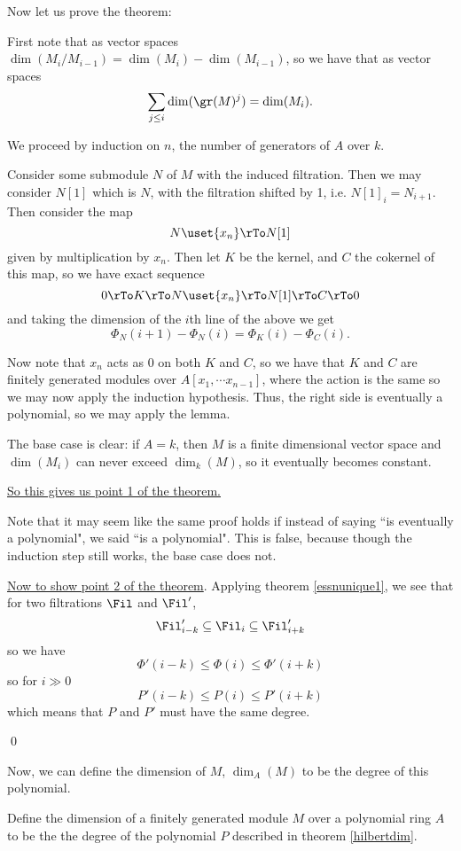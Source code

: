 \documentclass[12 pt]{article}
\theoremstyle{definition}
\begin{document}
Now let us prove the theorem:


First note that as vector spaces $\dim(M_i/M_{i-1})=\dim(M_i)-\dim(M_{i-1})$, so we have that as vector spaces
\[\sum_{j \leq i} \dim(\gr(M)^j)=\dim(M_i).\]

We proceed by induction on $n$, the number of generators of $A$ over $k$.

Consider some submodule $N$ of $M$ with the induced filtration. Then we may consider $N[1]$ which is $N$, with the filtration shifted by 1, i.e. $N[1]_i=N_{i+1}$. Then consider the map
\[N \uset{x_n}\rTo N[1]\]
given by multiplication by $x_n$. Then let $K$ be the kernel, and $C$ the cokernel of this map, so we have exact sequence
\[0 \rTo K \rTo N \uset{x_n}\rTo N[1] \rTo C \rTo 0\]
and taking the dimension of the $i$th line of the above we get
\[\Phi_N(i+1)-\Phi_N(i)=\Phi_K(i)-\Phi_C(i).\]

Now note that $x_n$ acts as 0 on both $K$ and $C$, so we have that $K$ and $C$ are finitely generated modules over $A[x_1, \cdots x_{n-1}]$, where the action is the same so we may now apply the induction hypothesis. Thus, the right side is eventually a polynomial, so we may apply the lemma.

The base case is clear: if $A=k$, then $M$ is a finite dimensional vector space and $\dim(M_i)$ can never exceed $\dim_k(M)$, so it eventually becomes constant.

\uline{So this gives us point 1 of the theorem.}

\begin{remark} Note that it may seem like the same proof holds if instead of saying ``is eventually a polynomial", we said ``is a polynomial". This is false, because though the induction step still works, the base case does not.
\end{remark}

\uline{Now to show point 2 of the theorem}. Applying theorem \ref{essnunique1}, we see that for two filtrations $\Fil$ and $\Fil'$, \[\Fil'_{i-k} \subseteq \Fil_i \subseteq \Fil_{i+k}'\]
so we have
\[\Phi'(i-k) \leq \Phi(i) \leq \Phi'(i+k)\]
so for $i \gg 0$
\[P'(i-k) \leq P(i) \leq P'(i+k)\]
which means that $P$ and $P'$ must have the same degree.

\qed

Now, we can define the dimension of $M$, $\dim_A(M)$ to be the degree of this polynomial.

\begin{definition} Define the dimension of a finitely generated module $M$ over a polynomial ring $A$ to be the the degree of the polynomial $P$ described in theorem \ref{hilbertdim}.
\end{definition}
\end{document}
